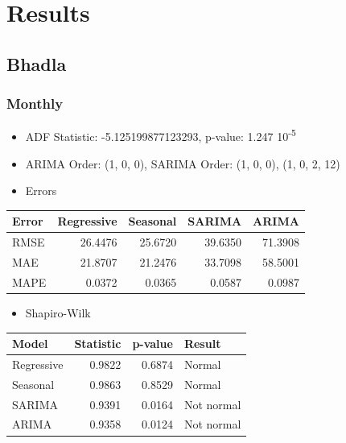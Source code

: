 \documentclass[a4paper,12pt]{article}
\begin{document}
\pagebreak

\section{Results}
\label{sec:orgbfd2bcb}
\subsection{Bhadla}
\label{sec:org053fdd4}
\subsubsection{Monthly}
\label{sec:orgaac700a}
\begin{itemize}
\item ADF Statistic: -5.125199877123293, p-value: 1.247 \texttimes{} 10\textsuperscript{-5}
\item ARIMA Order: (1, 0, 0), SARIMA Order: (1, 0, 0), (1, 0, 2, 12)
\item Errors
\end{itemize}
\begin{center}
\begin{tabular}{lrrrr}
Error & Regressive & \textbf{Seasonal} & SARIMA & ARIMA\\[0pt]
\hline
RMSE & 26.4476 & 25.6720 & 39.6350 & 71.3908\\[0pt]
MAE & 21.8707 & 21.2476 & 33.7098 & 58.5001\\[0pt]
MAPE & 0.0372 & 0.0365 & 0.0587 & 0.0987\\[0pt]
\end{tabular}
\end{center}
\begin{itemize}
\item Shapiro-Wilk
\end{itemize}
\begin{center}
\begin{tabular}{lrrl}
Model & Statistic & p-value & Result\\[0pt]
\hline
Regressive & 0.9822 & 0.6874 & Normal\\[0pt]
Seasonal & 0.9863 & 0.8529 & Normal\\[0pt]
SARIMA & 0.9391 & 0.0164 & Not normal\\[0pt]
ARIMA & 0.9358 & 0.0124 & Not normal\\[0pt]
\end{tabular}
\end{center}
\end{document}
